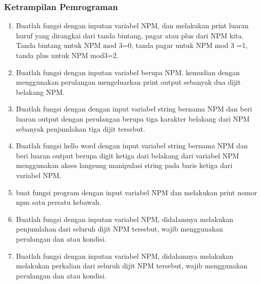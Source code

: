 \subsubsection{Ketrampilan Pemrograman}
\begin{enumerate}
    \item Buatlah fungsi dengan inputan variabel NPM, dan melakukan print luaran huruf yang dirangkai dari tanda bintang, pagar atau plus dari NPM kita. Tanda bintang untuk NPM mod 3=0, tanda pagar untuk NPM mod 3 =1, tanda plus untuk NPM mod3=2.
    

    \item Buatlah fungsi dengan inputan variabel berupa NPM. kemudian dengan menggunakan perulangan mengeluarkan print output sebanyak dua dijit belakang NPM.
    

    \item Buatlah fungsi dengan dengan input variabel string bernama NPM dan beri luaran output dengan perulangan berupa tiga karakter belakang dari NPM sebanyak penjumlahan tiga dijit tersebut.
    

    \item Buatlah fungsi hello word dengan input variabel string bernama NPM dan beri luaran output berupa digit ketiga dari belakang dari variabel NPM menggunakan akses langsung manipulasi string pada baris ketiga dari variabel NPM.
    

    \item buat fungsi program dengan input variabel NPM dan melakukan print nomor npm satu persatu kebawah.
    

    \item Buatlah fungsi dengan inputan variabel NPM, didalamnya melakukan penjumlahan dari seluruh dijit NPM tersebut, wajib menggunakan perulangan dan atau kondisi.
        

    \item Buatlah fungsi dengan inputan variabel NPM, didalamnya melakukan melakukan perkalian dari seluruh dijit NPM tersebut, wajib menggunakan perulangan dan atau kondisi.
        


\end{enumerate}
